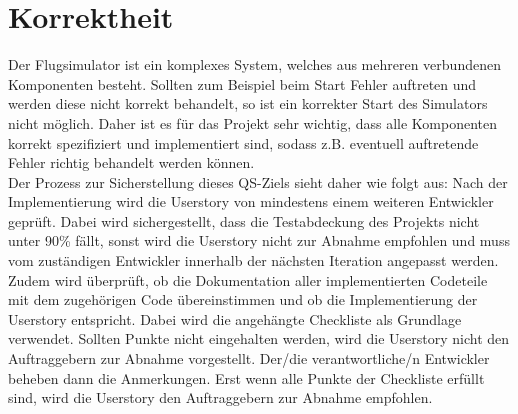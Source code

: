 \documentclass[accentcolor=tud9c,12pt,paper=a4]{tudreport}
\begin{document}
		\section{Korrektheit}
		Der Flugsimulator ist ein komplexes System, welches aus mehreren verbundenen Komponenten besteht.
		Sollten zum Beispiel beim Start Fehler auftreten und werden diese nicht korrekt behandelt, so
		ist ein korrekter Start des Simulators nicht möglich. Daher ist es für das Projekt
		sehr wichtig, dass alle Komponenten korrekt spezifiziert und implementiert sind,
		sodass z.B. eventuell auftretende Fehler richtig behandelt werden können.
		\\[5pt]
		Der Prozess zur Sicherstellung dieses QS-Ziels sieht daher wie folgt aus:
		Nach der Implementierung wird die Userstory von mindestens einem weiteren
		Entwickler geprüft. Dabei wird sichergestellt, dass die Testabdeckung des Projekts
		nicht unter 90\% fällt, sonst wird die Userstory nicht zur Abnahme empfohlen und
		muss vom zuständigen Entwickler innerhalb der nächsten Iteration angepasst werden.
		\\[5pt]
		Zudem wird überprüft, ob die Dokumentation aller implementierten
		Codeteile mit dem zugehörigen Code übereinstimmen und ob die Implementierung der
		Userstory entspricht. Dabei wird die angehängte Checkliste als Grundlage verwendet.
		Sollten Punkte nicht eingehalten werden, wird die Userstory nicht den Auftraggebern zur
		Abnahme vorgestellt. Der/die verantwortliche/n Entwickler beheben dann die Anmerkungen.
		Erst wenn alle Punkte der Checkliste erfüllt sind, wird die Userstory den Auftraggebern
		zur Abnahme empfohlen.
		\newpage		
\end{document}
